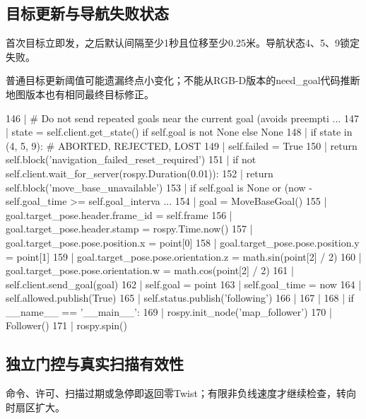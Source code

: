 \subsection{目标更新与导航失败状态}
首次目标立即发，之后默认间隔至少1秒且位移至少0.25米。导航状态4、5、9锁定失败。

普通目标更新阈值可能遗漏终点小变化；不能从RGB-D版本的need\_goal代码推断地图版本也有相同最终目标修正。
\begin{CodeBlock}
 146 |         # Do not send repeated goals near the current goal (avoids preempti ...
 147 |         state = self.client.get_state() if self.goal is not None else None
 148 |         if state in (4, 5, 9):  # ABORTED, REJECTED, LOST
 149 |             self.failed = True
 150 |             return self.block('navigation_failed_reset_required')
 151 |         if not self.client.wait_for_server(rospy.Duration(0.01)):
 152 |             return self.block('move_base_unavailable')
 153 |         if self.goal is None or (now - self.goal_time >= self.goal_interva  ...
 154 |             goal = MoveBaseGoal()
 155 |             goal.target_pose.header.frame_id = self.frame
 156 |             goal.target_pose.header.stamp = rospy.Time.now()
 157 |             goal.target_pose.pose.position.x = point[0]
 158 |             goal.target_pose.pose.position.y = point[1]
 159 |             goal.target_pose.pose.orientation.z = math.sin(point[2] / 2)
 160 |             goal.target_pose.pose.orientation.w = math.cos(point[2] / 2)
 161 |             self.client.send_goal(goal)
 162 |             self.goal = point
 163 |             self.goal_time = now
 164 |         self.allowed.publish(True)
 165 |         self.status.publish('following')
 166 | 
 167 | 
 168 | if __name__ == '__main__':
 169 |     rospy.init_node('map_follower')
 170 |     Follower()
 171 |     rospy.spin()
\end{CodeBlock}
\subsection{独立门控与真实扫描有效性}
命令、许可、扫描过期或急停即返回零Twist；有限非负线速度才继续检查，转向时扇区扩大。

